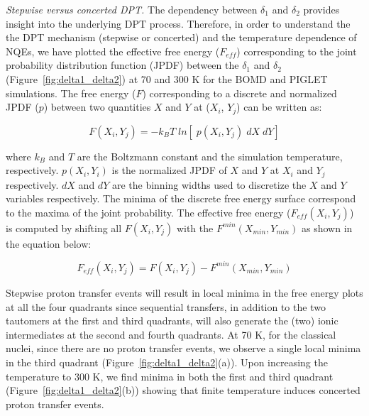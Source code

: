 \noindent \textit{Stepwise versus concerted DPT.} The dependency between $\delta_{1}$ and $\delta_{2}$ provides insight into the underlying DPT process. Therefore, in order to understand the the DPT mechanism (stepwise or concerted) and the temperature dependence of NQEs, we have plotted the effective free energy ($F_{eff}$) corresponding to the joint  probability distribution function (JPDF) between the $\delta_1$ and $\delta_2$ (Figure~\ref{fig:delta1_delta2}) at 70 and 300 K for the BOMD and PIGLET simulations. The free energy ($F$) corresponding to a discrete and normalized JPDF ($p$) between two quantities $X$ and $Y$ at ($X_i$, $Y_j$) can be written as: 

\begin{equation}
   F(X_i,Y_j) = -k_{B}T \; ln[\;p(X_i,Y_j) \; dX\;dY] 
    \label{free_energy}
\end{equation}

\noindent where $k_B$ and $T$ are the Boltzmann constant and the simulation temperature, respectively. $p(X_i,Y_i)$ is the normalized JPDF of $X$ and $Y$ at $X_i$ and $Y_j$ respectively. $dX$ and $dY$ are the binning widths used to discretize the $X$ and $Y$ variables respectively. The minima of the discrete free energy surface correspond to the maxima of the joint probability. The effective free energy ($F_{eff}(X_i,Y_j)$) is computed by shifting all $F(X_i,Y_j)$ with the $F^{min}(X_{min},Y_{min})$ as shown in the 
equation below:

\begin{equation}
 \label{free_energy_eff}
 F_{eff}(X_i,Y_j) = F(X_i,Y_j) - F^{min}(X_{min},Y_{min})
\end{equation}

Stepwise proton transfer events will result in local minima in the free energy plots at all the four quadrants since sequential transfers, in addition to the two tautomers at the first and third quadrants, will also generate the (two) ionic intermediates at the second and fourth quadrants. At 70 K, for the classical nuclei,
since there are no proton transfer events, we observe a single local minima
in the third quadrant (Figure~\ref{fig:delta1_delta2}(a)).
Upon increasing the temperature to 300 K, we find minima in both the 
first and third quadrant (Figure~\ref{fig:delta1_delta2}(b)) showing that finite temperature induces concerted proton transfer events.

